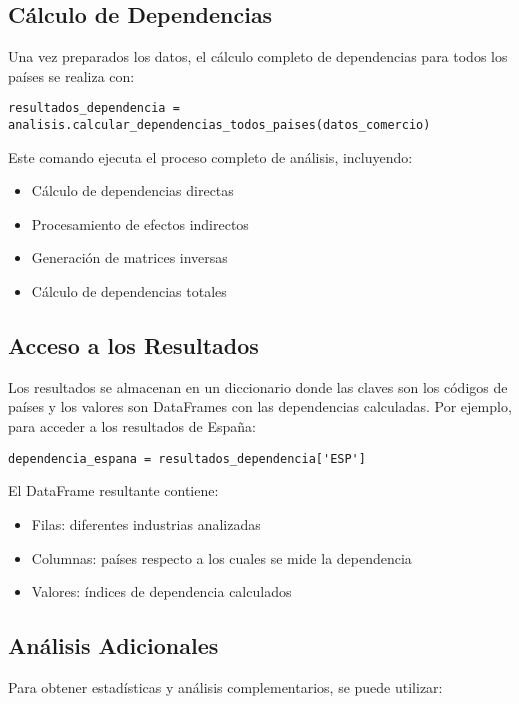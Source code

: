 \documentclass[authoryear]{elsarticle}
\begin{document}
\subsection{Cálculo de Dependencias}

Una vez preparados los datos, el cálculo completo de dependencias para todos los países se realiza con:

\begin{verbatim}
resultados_dependencia = analisis.calcular_dependencias_todos_paises(datos_comercio)
\end{verbatim}

Este comando ejecuta el proceso completo de análisis, incluyendo:
\begin{itemize}
    \item Cálculo de dependencias directas
    \item Procesamiento de efectos indirectos
    \item Generación de matrices inversas
    \item Cálculo de dependencias totales
\end{itemize}

\subsection{Acceso a los Resultados}

Los resultados se almacenan en un diccionario donde las claves son los códigos de países y los valores son DataFrames con las dependencias calculadas. Por ejemplo, para acceder a los resultados de España:

\begin{verbatim}
dependencia_espana = resultados_dependencia['ESP']
\end{verbatim}

El DataFrame resultante contiene:
\begin{itemize}
    \item Filas: diferentes industrias analizadas
    \item Columnas: países respecto a los cuales se mide la dependencia
    \item Valores: índices de dependencia calculados
\end{itemize}

\subsection{Análisis Adicionales}

Para obtener estadísticas y análisis complementarios, se puede utilizar:
\end{document}
